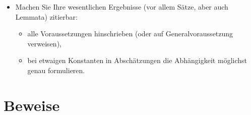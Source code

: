\documentclass[a4paper,11pt,bibliography=totoc,listof=totoc,headinclude=true,cleardoublepage=empty,oneside]{scrbook}
\begin{document}
{\begin{itemize}
\item Machen Sie Ihre wesentlichen Ergebnisse (vor allem Sätze, aber auch Lemmata) zitierbar:
\begin{itemize}
\item alle Voraussetzungen hinschrieben (oder auf Generalvoraussetzung verweisen),
\item bei etwaigen Konstanten in Abschätzungen die Abhängigkeit möglichst genau formulieren.
\end{itemize}

\end{itemize}
}

\section{Beweise}
\end{document}

